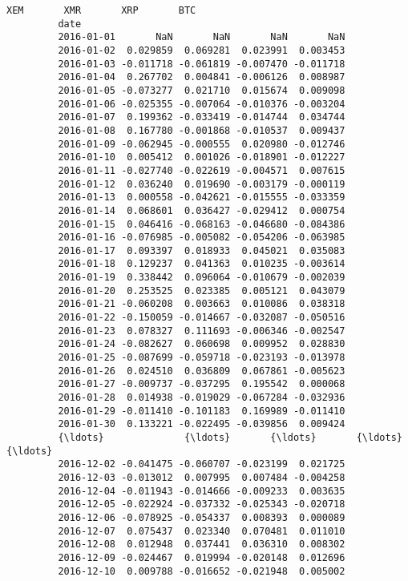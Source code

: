 \documentclass[11pt]{article}
\begin{document}
\begin{Verbatim}[commandchars=\\\{\}]
                          XEM       XMR       XRP       BTC  
         date                                                
         2016-01-01       NaN       NaN       NaN       NaN  
         2016-01-02  0.029859  0.069281  0.023991  0.003453  
         2016-01-03 -0.011718 -0.061819 -0.007470 -0.011718  
         2016-01-04  0.267702  0.004841 -0.006126  0.008987  
         2016-01-05 -0.073277  0.021710  0.015674  0.009098  
         2016-01-06 -0.025355 -0.007064 -0.010376 -0.003204  
         2016-01-07  0.199362 -0.033419 -0.014744  0.034744  
         2016-01-08  0.167780 -0.001868 -0.010537  0.009437  
         2016-01-09 -0.062945 -0.000555  0.020980 -0.012746  
         2016-01-10  0.005412  0.001026 -0.018901 -0.012227  
         2016-01-11 -0.027740 -0.022619 -0.004571  0.007615  
         2016-01-12  0.036240  0.019690 -0.003179 -0.000119  
         2016-01-13  0.000558 -0.042621 -0.015555 -0.033359  
         2016-01-14  0.068601  0.036427 -0.029412  0.000754  
         2016-01-15  0.046416 -0.068163 -0.046680 -0.084386  
         2016-01-16 -0.076985 -0.005082 -0.054206 -0.063985  
         2016-01-17  0.093397  0.018933  0.045021  0.035083  
         2016-01-18  0.129237  0.041363  0.010235 -0.003614  
         2016-01-19  0.338442  0.096064 -0.010679 -0.002039  
         2016-01-20  0.253525  0.023385  0.005121  0.043079  
         2016-01-21 -0.060208  0.003663  0.010086  0.038318  
         2016-01-22 -0.150059 -0.014667 -0.032087 -0.050516  
         2016-01-23  0.078327  0.111693 -0.006346 -0.002547  
         2016-01-24 -0.082627  0.060698  0.009952  0.028830  
         2016-01-25 -0.087699 -0.059718 -0.023193 -0.013978  
         2016-01-26  0.024510  0.036809  0.067861 -0.005623  
         2016-01-27 -0.009737 -0.037295  0.195542  0.000068  
         2016-01-28  0.014938 -0.019029 -0.067284 -0.032936  
         2016-01-29 -0.011410 -0.101183  0.169989 -0.011410  
         2016-01-30  0.133221 -0.022495 -0.039856  0.009424  
         {\ldots}              {\ldots}       {\ldots}       {\ldots}       {\ldots}  
         2016-12-02 -0.041475 -0.060707 -0.023199  0.021725  
         2016-12-03 -0.013012  0.007995  0.007484 -0.004258  
         2016-12-04 -0.011943 -0.014666 -0.009233  0.003635  
         2016-12-05 -0.022924 -0.037332 -0.025343 -0.020718  
         2016-12-06 -0.078925 -0.054337  0.008393  0.000089  
         2016-12-07  0.075437  0.023340  0.070481  0.011010  
         2016-12-08  0.012948  0.037441  0.036310  0.008302  
         2016-12-09 -0.024467  0.019994 -0.020148  0.012696  
         2016-12-10  0.009788 -0.016652 -0.021948  0.005002  

\end{Verbatim}
\end{document}
